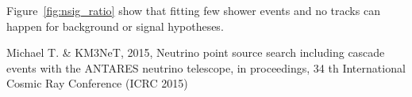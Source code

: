 \documentclass[final,twoside,onecolumn,10pt]{article}
\begin{document}
	Figure~\ref{fig:nsig_ratio} show that fitting few shower events and no tracks can happen for background or signal hypotheses.



\begin{thebibliography}{3}
%
%
%
	 Michael T. \& KM3NeT, 2015, Neutrino point source search including cascade events with the ANTARES neutrino telescope, in proceedings, 34 th International Cosmic Ray Conference (ICRC 2015)
	
\end{thebibliography}
\end{document}
